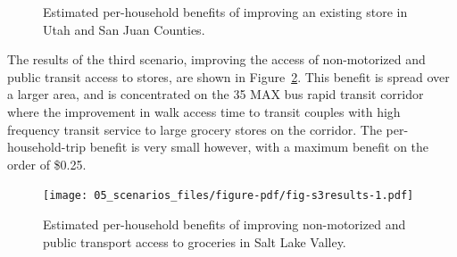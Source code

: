 \documentclass[
  letterpaper,
  DIV=11,
  numbers=noendperiod]{scrreport}
\begin{document}
\begin{figure}

\begin{minipage}[t]{0.50\linewidth}

{\centering 


}

\end{minipage}%
%
\begin{minipage}[t]{0.50\linewidth}

{\centering 


}

\end{minipage}%

\caption{\label{fig-s2sjut}Estimated per-household benefits of improving
an existing store in Utah and San Juan Counties.}

\end{figure}

The results of the third scenario, improving the access of non-motorized
and public transit access to stores, are shown in
Figure~\ref{fig-s3results}. This benefit is spread over a larger area,
and is concentrated on the 35 MAX bus rapid transit corridor where the
improvement in walk access time to transit couples with high frequency
transit service to large grocery stores on the corridor. The
per-household-trip benefit is very small however, with a maximum benefit
on the order of \$0.25.

\begin{figure}[t]

{\centering \texttt{[image: 05\_scenarios\_files/figure-pdf/fig-s3results-1.pdf]}

}

\caption{\label{fig-s3results}Estimated per-household benefits of
improving non-motorized and public transport access to groceries in Salt
Lake Valley.}

\end{figure}
\end{document}
